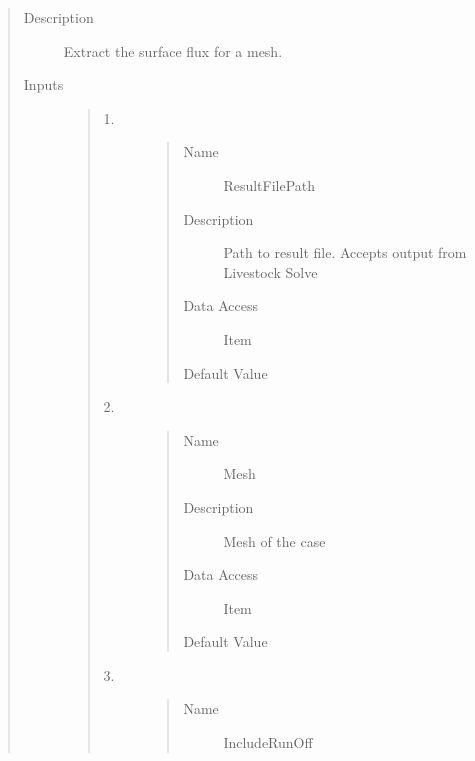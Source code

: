 \documentclass[letterpaper,10pt,english]{sphinxmanual}
\begin{document}
\begin{quote}\begin{description}
\item[{Description}] \leavevmode
Extract the surface flux for a mesh.

\item[{Inputs}] \leavevmode\begin{quote}\begin{description}
\item[{1.}] \leavevmode\begin{quote}\begin{description}
\item[{Name}] \leavevmode
ResultFilePath

\item[{Description}] \leavevmode
Path to result file. Accepts output from Livestock Solve

\item[{Data Access}] \leavevmode
Item

\item[{Default Value}] \leavevmode
{}

\end{description}\end{quote}

\item[{2.}] \leavevmode\begin{quote}\begin{description}
\item[{Name}] \leavevmode
Mesh

\item[{Description}] \leavevmode
Mesh of the case

\item[{Data Access}] \leavevmode
Item

\item[{Default Value}] \leavevmode
{}

\end{description}\end{quote}

\item[{3.}] \leavevmode\begin{quote}\begin{description}
\item[{Name}] \leavevmode
IncludeRunOff


\end{description}
\end{quote}
\end{description}
\end{quote}
\end{description}
\end{quote}
\end{document}
